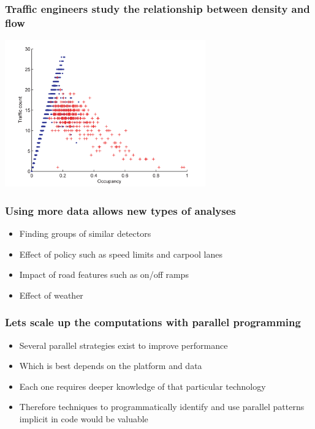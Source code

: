\documentclass{beamer}
\begin{document}
\begin{frame}

    \frametitle{Traffic engineers study the relationship between 
    density and flow \cite{li2011fundamental}}

\centerline{\includegraphics[height=2.5in]{fundamental_diagram.png}}

\end{frame}
\begin{frame}

    \frametitle{Using more data allows new types of analyses}

    \begin{itemize}
        \item Finding groups of similar detectors
        \item Effect of policy such as speed limits and carpool lanes
        \item Impact of road features such as on/off ramps
        \item Effect of weather
    \end{itemize}

\end{frame}
\begin{frame}

    \frametitle{Lets scale up the computations with parallel programming}

    \begin{itemize}
        \item Several parallel strategies exist to improve performance
        \item Which is best depends on the platform and data
        \item Each one requires deeper knowledge of that particular technology
        \item Therefore techniques to programmatically identify and use parallel
  patterns implicit in code would be valuable
    \end{itemize}

\end{frame}
\end{document}
